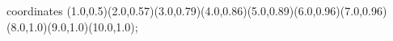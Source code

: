 					coordinates { (1.0,0.5)(2.0,0.57)(3.0,0.79)(4.0,0.86)(5.0,0.89)(6.0,0.96)(7.0,0.96)(8.0,1.0)(9.0,1.0)(10.0,1.0)};
